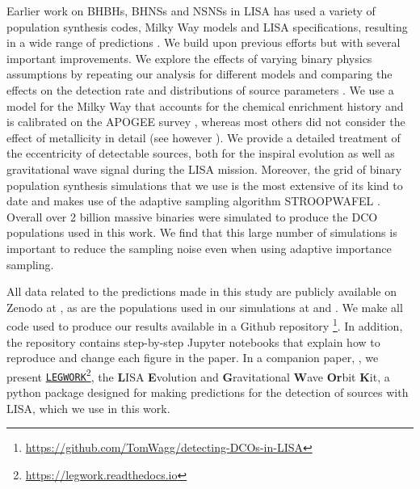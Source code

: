 Earlier work on BHBHs, BHNSs and NSNSs in LISA has used a variety of population synthesis codes, Milky Way models and LISA specifications, resulting in a wide range of predictions \citep{Nelemans+2001,Belczynski+2010,Liu+2014,Lamberts+2019,Lau+2020,Breivik+2020,Sesana+2020, Shao+2021}. We build upon previous efforts but with several important improvements. We explore the effects of varying binary physics assumptions by repeating our analysis for \nModels{} different models and comparing the effects on the detection rate and distributions of source parameters \citep{Broekgaarden+2021,Broekgaarden+2021b}. We use a model for the Milky Way that accounts for the chemical enrichment history and is calibrated on the APOGEE survey \citep{Majewski+2017,Frankel+2018}, whereas most others did not consider the effect of metallicity in detail (see however \citealp{Lamberts+2019, Sesana+2020}). We provide a detailed treatment of the eccentricity of detectable sources, both for the inspiral evolution as well as gravitational wave signal during the LISA mission. Moreover, the grid of binary population synthesis simulations that we use is the most extensive of its kind to date and makes use of the adaptive sampling algorithm STROOPWAFEL \citep{Broekgaarden+2019, Broekgaarden+2021}. Overall over 2 billion massive binaries were simulated to produce the DCO populations used in this work. We find that this large number of simulations is important to reduce the sampling noise even when using adaptive importance sampling.

All data related to the predictions made in this study are publicly available on Zenodo at \citet{Wagg+2021_zenodo}, as are the populations used in our simulations at \citet[][BHBH]{Broekgaarden:2021-zenodo-BHBH} \citet[][BHNS]{Broekgaarden:2021-zenodo-BHNS} and  \citet[][NSNS]{Broekgaarden:2021-zenodo-NSNS}. We make all code used to produce our results available in a Github repository \href{https://github.com/TomWagg/detecting-DCOs-in-LISA}{\faGithub}\footnote{\url{https://github.com/TomWagg/detecting-DCOs-in-LISA}}. In addition, the repository contains step-by-step Jupyter notebooks that explain how to reproduce and change each figure in the paper. In a companion paper, \citet{Wagg+2021}, we present \href{https://legwork.readthedocs.io}{\texttt{LEGWORK}}\footnote{\url{https://legwork.readthedocs.io}}, the \textbf{L}ISA \textbf{E}volution and \textbf{G}ravitational \textbf{W}ave \textbf{Or}bit \textbf{K}it, a python package designed for making predictions for the detection of sources with LISA, which we use in this work.

